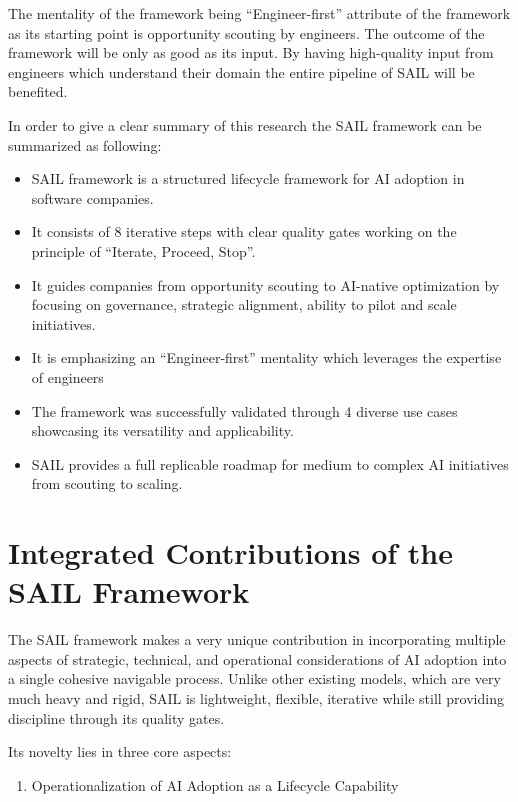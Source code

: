 \documentclass[]{imc-inf}
\def\tightlist{}
\begin{document}
The mentality of the framework being ``Engineer-first'' attribute of the
framework as its starting point is opportunity scouting by engineers.
The outcome of the framework will be only as good as its input. By
having high-quality input from engineers which understand their domain
the entire pipeline of SAIL will be benefited.

In order to give a clear summary of this research the SAIL framework can
be summarized as following:

\begin{itemize}
	\tightlist
	\item
	SAIL framework is a structured lifecycle framework for AI adoption in
	software companies.
	\item
	It consists of 8 iterative steps with clear quality gates working on
	the principle of ``Iterate, Proceed, Stop''.
	\item
	It guides companies from opportunity scouting to AI-native
	optimization by focusing on governance, strategic alignment, ability
	to pilot and scale initiatives.
	\item
	It is emphasizing an ``Engineer-first'' mentality which leverages the
	expertise of engineers
	\item
	The framework was successfully validated through 4 diverse use cases
	showcasing its versatility and applicability.
	\item
	SAIL provides a full replicable roadmap for medium to complex AI
	initiatives from scouting to scaling.
\end{itemize}

\section{Integrated Contributions of the SAIL
	Framework}\label{integrated-contributions-of-the-sail-framework}

The SAIL framework makes a very unique contribution in incorporating
multiple aspects of strategic, technical, and operational considerations
of AI adoption into a single cohesive navigable process. Unlike other
existing models, which are very much heavy and rigid, SAIL is
lightweight, flexible, iterative while still providing discipline
through its quality gates.

Its novelty lies in three core aspects:

\begin{enumerate}
	\def\labelenumi{\arabic{enumi}.}
	\tightlist
	\item
	Operationalization of AI Adoption as a Lifecycle Capability
\end{enumerate}
\end{document}

